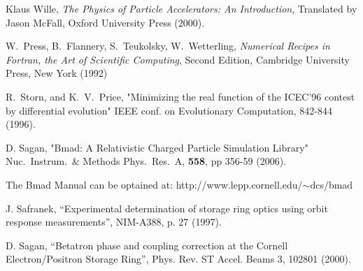 \begin{thebibliography}{99}

Klaus Wille, {\em The Physics of Particle Accelerators: An Introduction},
Translated by Jason McFall, Oxford University Press (2000).

W.~Press, B.~Flannery, S.~Teukolsky, W.~Wetterling,
{\em Numerical Recipes in Fortran, the Art of Scientific Computing},
Second Edition, Cambridge University Press, New York (1992)

R.~Storn, and K.~V.~Price, "Minimizing the real function of the
ICEC'96 contest by differential evolution" IEEE conf. on Evolutionary
Computation, 842-844 (1996).

D. Sagan,
"Bmad: A Relativistic Charged Particle Simulation Library"
Nuc.\ Instrum.\ \& Methods Phys.\ Res.\ A, {\bf 558}, pp 356-59 (2006).

The Bmad Manual can be optained at:\hfill\break
\hspace*{20pt} http://www.lepp.cornell.edu/$\scriptstyle\sim$dcs/bmad

J. Safranek, ``Experimental determination of storage ring optics
using orbit response measurements'', NIM-A388, p. 27 (1997).

D. Sagan,
``Betatron phase and coupling correction at the Cornell Electron/Positron
Storage Ring'', Phys. Rev. ST Accel. Beams 3, 102801 (2000).

\end{thebibliography}
